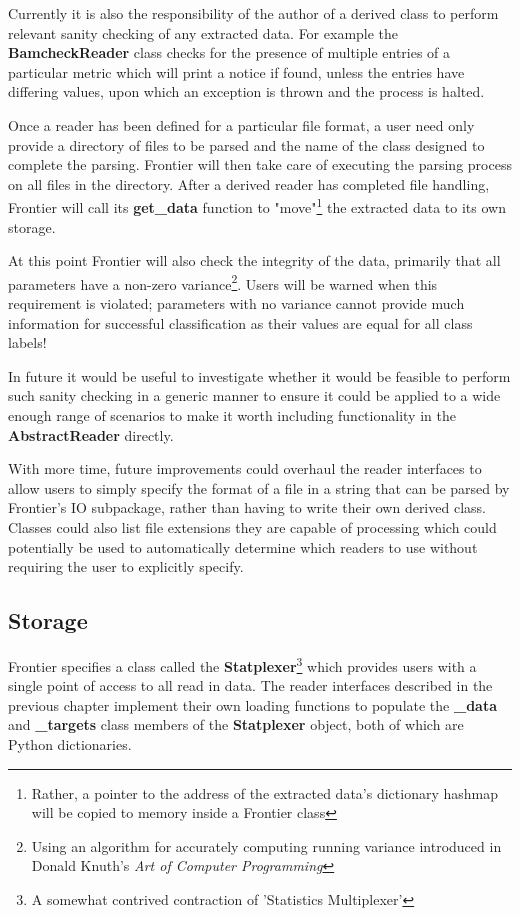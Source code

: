 Currently it is also the responsibility of the author of a derived class to
perform relevant sanity checking of any extracted data. For example the
\textbf{BamcheckReader} class checks for the presence of multiple entries of a
particular metric which will print a notice if found, unless the entries have
differing values, upon which an exception is thrown and the process is halted.

Once a reader has been defined for a particular file format, a user need only
provide a directory of files to be parsed and the name of the class designed to
complete the parsing. Frontier will then take care of executing the parsing
process on all files in the directory. After a derived reader has completed file
handling, Frontier will call its \textbf{get\_data} function to
"move"\footnote{Rather, a pointer to the address of the extracted data's
dictionary hashmap will be copied to memory inside a Frontier class} the
extracted data to its own storage.

At this point Frontier will also check the integrity of the data, primarily
that all parameters have a non-zero variance\footnote{Using an algorithm for
accurately computing running variance introduced in Donald Knuth's \textit{Art
of Computer Programming}\citep{knuth1998art-variance}}. Users will be warned
when this requirement is violated; parameters with no variance cannot provide
much information for successful classification as their values are equal for
all class labels!

In future it would be useful to investigate whether it would be feasible to
perform such sanity checking in a generic manner to ensure it could be applied
to a wide enough range of scenarios to make it worth including functionality in
the \textbf{AbstractReader} directly.

With more time, future improvements could overhaul the reader interfaces
to allow users to simply specify the format of a file in a string that can be
parsed by Frontier's IO subpackage, rather than having to write their own derived
class. Classes could also list file extensions they are capable of processing
which could potentially be used to automatically determine which readers to use
without requiring the user to explicitly specify.


\subsection{Storage}

Frontier specifies a class called the \textbf{Statplexer}\footnote{A somewhat
contrived contraction of 'Statistics Multiplexer'} which provides users with a
single point of access to all read in data. The reader interfaces described in
the previous chapter implement their own loading functions to populate the
\textbf{\_data} and \textbf{\_targets} class members of the \textbf{Statplexer}
object, both of which are Python dictionaries.

